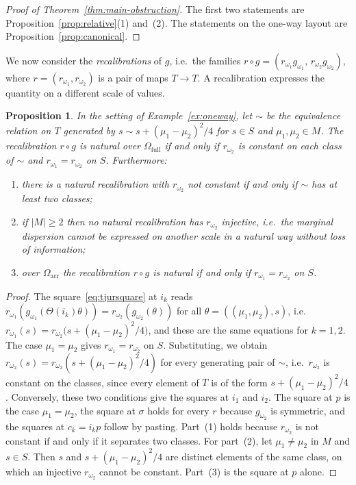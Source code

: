 \documentclass[11pt,a4paper]{article}
\theoremstyle{plain}
\newtheorem{proposition}[theorem]{Proposition}
\theoremstyle{definition}
\theoremstyle{remark}
\newcommand{\cat}[1]{\mathsf{#1}}
\newcommand{\catO}{\cat{\Omega}}
\begin{document}
\begin{proof}[Proof of Theorem~\ref{thm:main-obstruction}]
The first two statements are Proposition~\ref{prop:relative}(1) and~(2). The
statements on the one-way layout are Proposition~\ref{prop:canonical}.
\end{proof}

We now consider the \emph{recalibrations} of $g$, i.e.\ the families
$r \circ g = (r_{\omega_1}g_{\omega_1},\, r_{\omega_2}g_{\omega_2})$, where
$r = (r_{\omega_1},r_{\omega_2})$ is a pair of maps $T \to T$. A recalibration
expresses the quantity on a different scale of values.

\begin{proposition}\label{prop:recalib}
In the setting of Example~\ref{ex:oneway}, let $\sim$ be the equivalence
relation on $T$ generated by $s \sim s + (\mu_1-\mu_2)^{2}/4$ for $s \in S$
and $\mu_1,\mu_2 \in M$. The recalibration $r \circ g$ is natural over
$\catO_{\mathrm{full}}$ if and only if $r_{\omega_2}$ is constant on each
class of $\sim$ and $r_{\omega_1} = r_{\omega_2}$ on $S$. Furthermore:
\begin{enumerate}
\item there is a natural recalibration with $r_{\omega_2}$ not constant if and
only if $\sim$ has at least two classes;
\item if $|M| \ge 2$ then no natural recalibration has $r_{\omega_2}$
injective, i.e.\ the marginal dispersion cannot be expressed on another scale
in a natural way without loss of information;
\item over $\catO_{\mathrm{arr}}$ the recalibration $r \circ g$ is natural if
and only if $r_{\omega_1} = r_{\omega_2}$ on $S$.
\end{enumerate}
\end{proposition}

\begin{proof}
The square~\eqref{eq:tjursquare} at $i_k$ reads
$r_{\omega_1}(g_{\omega_1}(\Theta(i_k)\theta)) =
r_{\omega_2}(g_{\omega_2}(\theta))$ for all $\theta = ((\mu_1,\mu_2),s)$, i.e.\
$r_{\omega_1}(s) = r_{\omega_2}\bigl(s + (\mu_1-\mu_2)^{2}/4\bigr)$, and these
are the same equations for $k = 1,2$. The case $\mu_1 = \mu_2$ gives
$r_{\omega_1} = r_{\omega_2}$ on $S$. Substituting, we obtain
$r_{\omega_2}(s) = r_{\omega_2}(s + (\mu_1-\mu_2)^{2}/4)$ for every generating
pair of $\sim$, i.e.\ $r_{\omega_2}$ is constant on the classes, since every
element of $T$ is of the form $s + (\mu_1-\mu_2)^{2}/4$. Conversely, these two
conditions give the squares at $i_1$ and $i_2$. The square at $p$ is the case
$\mu_1 = \mu_2$, the square at $\sigma$ holds for every $r$ because
$g_{\omega_2}$ is symmetric, and the squares at $c_k = i_k p$ follow by
pasting. Part~(1) holds because $r_{\omega_2}$ is not constant if and only if
it separates two classes. For part~(2), let $\mu_1 \neq \mu_2$ in $M$ and
$s \in S$. Then $s$ and $s + (\mu_1-\mu_2)^{2}/4$ are distinct elements of the
same class, on which an injective $r_{\omega_2}$ cannot be constant. Part~(3)
is the square at $p$ alone.
\end{proof}
\end{document}
